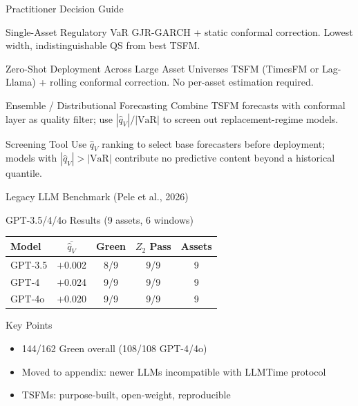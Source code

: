 \documentclass[9pt, aspectratio=169, t]{beamer}
\newcommand{\VaR}{\mathrm{VaR}}
\newcommand{\qV}{\hat{q}_V}
\begin{document}
\begin{frame}{Practitioner Decision Guide}
	\vspace{-0.3cm}
	{\small
	\begin{exampleblock}{Single-Asset Regulatory VaR}
		GJR-GARCH + static conformal correction. Lowest width, indistinguishable QS from best TSFM.
	\end{exampleblock}
	\begin{block}{Zero-Shot Deployment Across Large Asset Universes}
		TSFM (TimesFM or Lag-Llama) + rolling conformal correction. No per-asset estimation required.
	\end{block}
	\begin{block}{Ensemble / Distributional Forecasting}
		Combine TSFM forecasts with conformal layer as quality filter; use $|\qV|/|\VaR|$ to screen out replacement-regime models.
	\end{block}
	\begin{alertblock}{Screening Tool}
		Use $\qV$ ranking to select base forecasters before deployment; models with $|\qV| > |\VaR|$ contribute no predictive content beyond a historical quantile.
	\end{alertblock}
	}
\end{frame}

\begin{frame}{Legacy LLM Benchmark (Pele et al., 2026)}
	\vspace{-0.2cm}
	{\small
	\begin{block}{GPT-3.5/4/4o Results (9 assets, 6 windows)}
	\centering
	{\scriptsize
	\begin{tabular}{lcccc}
	\toprule
	Model & $\overline{\qV}$ & Green & $Z_2$ Pass & Assets \\
	\midrule
	GPT-3.5 & $+$0.002 & 8/9 & 9/9 & 9 \\
	GPT-4   & $+$0.024 & 9/9 & 9/9 & 9 \\
	GPT-4o  & $+$0.020 & 9/9 & 9/9 & 9 \\
	\bottomrule
	\end{tabular}
	}
	\end{block}

	\begin{block}{Key Points}
	\begin{itemize}\setlength{\itemsep}{2pt}
		\item 144/162 Green overall (108/108 GPT-4/4o)
		\item Moved to appendix: newer LLMs incompatible with LLMTime protocol
		\item TSFMs: purpose-built, open-weight, reproducible
	\end{itemize}
	\end{block}
	}
\end{frame}
\end{document}
